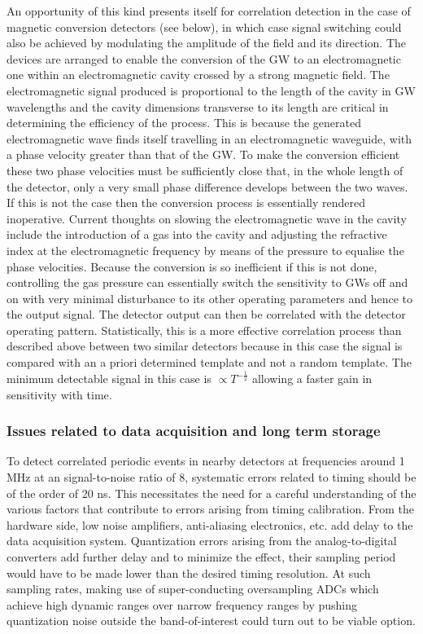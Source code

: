 \documentclass[11pt,a4paper]{article}
\begin{document}
An opportunity of this kind presents itself for correlation detection in the case of magnetic conversion detectors (see below), in which case signal switching could also be achieved by modulating the amplitude of the field and its direction. The devices are arranged to enable the conversion of the GW to an electromagnetic one within an electromagnetic cavity crossed by a strong magnetic field. The electromagnetic signal produced is proportional to the length of the cavity in GW wavelengths and the cavity dimensions transverse to its length are critical in determining the efficiency of the process. This is because the generated electromagnetic wave finds itself travelling in an electromagnetic waveguide, with a phase velocity greater than that of the GW. To make the conversion efficient these two phase velocities must be sufficiently close that, in the whole length of the detector, only a very small phase difference develops between the two waves. If this is not the case then the conversion process is essentially rendered inoperative. Current thoughts on slowing the electromagnetic wave in the cavity include the introduction of a gas into the cavity and adjusting the refractive index at the electromagnetic frequency by means of the pressure to equalise the phase velocities. Because the conversion is so inefficient if this is not done, controlling the gas pressure can essentially switch the sensitivity to GWs off and on with very minimal disturbance to its other operating parameters and hence to the output signal. The detector output can then be correlated with the detector operating pattern. Statistically, this is a more effective correlation process than described above between two similar detectors because in this case the signal is compared with an a priori determined template and not a random template. The minimum detectable signal in this case is $\propto T^{-\frac{1}{2}}$ allowing a faster gain in sensitivity with time.


\subsubsection{Issues related to data acquisition and long term storage}

To detect correlated periodic events in nearby detectors at frequencies around 1 MHz at an signal-to-noise ratio of 8, systematic errors related to timing should be of the order of 20 ns. This necessitates the need for a careful understanding of the various factors that contribute to errors arising from timing calibration. From the hardware side, low noise amplifiers, anti-aliasing electronics, etc. add delay to the data acquisition system. Quantization errors arising from the analog-to-digital converters add further delay and to minimize the effect, their sampling period would have to be made lower than the desired timing resolution. At such sampling rates, making use of super-conducting oversampling ADCs which achieve high dynamic ranges over narrow frequency ranges by pushing quantization noise outside the band-of-interest could turn out to be viable option.
\end{document}
